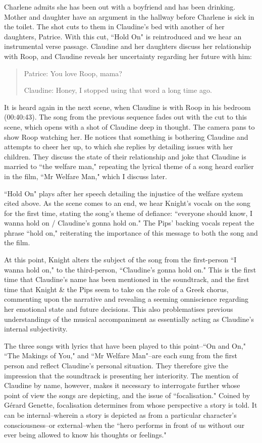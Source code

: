 Charlene admits she has been out with a boyfriend and has been drinking.
Mother and daughter have an argument in the hallway before Charlene is sick in the toilet.
The shot cuts to them in Claudine's bed with another of her daughters, Patrice.
With this cut, ``Hold On" is reintroduced and we hear an instrumental verse passage.
Claudine and her daughters discuss her relationship with Roop, and Claudine reveals her uncertainty regarding her future with him:
\begin{quote}
    Patrice: You love Roop, mama?
    
    Claudine: Honey, I stopped using that word a long time ago.
\end{quote}{}

It is heard again in the next scene, when Claudine is with Roop in his bedroom (00:40:43).
The song from the previous sequence fades out with the cut to this scene, which opens with a shot of Claudine deep in thought.
The camera pans to show Roop watching her.
He notices that something is bothering Claudine and attempts to cheer her up, to which she replies by detailing issues with her children.
They discuss the state of their relationship and joke that Claudine is married to ``the welfare man," repeating the lyrical theme of a song heard earlier in the film, ``Mr Welfare Man," which I discuss later.

``Hold On" plays after her speech detailing the injustice of the welfare system cited above.
As the scene comes to an end, we hear Knight's vocals on the song for the first time, stating the song's theme of defiance: ``everyone should know, I wanna hold on / Claudine's gonna hold on."
The Pips' backing vocals repeat the phrase ``hold on," reiterating the importance of this message to both the song and the film.

At this point, Knight alters the subject of the song from the first-person ``I wanna hold on," to the third-person, ``Claudine's gonna hold on."
This is the first time that Claudine's name has been mentioned in the soundtrack, and the first time that Knight \& the Pips seem to take on the role of a Greek chorus, commenting upon the narrative and revealing a seeming omniscience regarding her emotional state and future decisions.
This also problematises previous understandings of the musical accompaniment as essentially acting as Claudine's internal subjectivity.

The three songs with lyrics that have been played to this point–``On and On," ``The Makings of You," and ``Mr Welfare Man"–are each sung from the first person and reflect Claudine's personal situation.
They therefore give the impression that the soundtrack is presenting her interiority.
The mention of Claudine by name, however, makes it necessary to interrogate further whose point of view the songs are depicting, and the issue of ``focalisation."
Coined by Gérard Genette, focalisation determines from whose perspective a story is told.
It can be internal–wherein a story is depicted as from a particular character’s consciousness–or external–when the ``hero performs in front of us without our ever being allowed to know his thoughts or feelings."\autocites[][190]{genette_narrative_1980}


